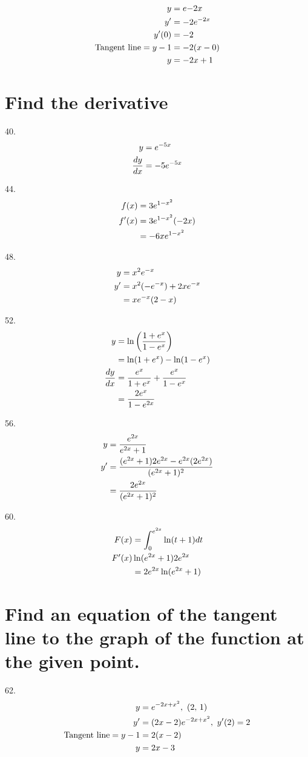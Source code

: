 \documentclass[11pt]{article}
\newcommand*{\set}{\setcounter{equation}{0}}
\newcommand*{\lt}{\left}
\newcommand*{\rt}{\right}
\newcommand*{\s}{\section}
\begin{document}
\begin{align}
    \set
    y&=e{-2x}\\
    y'&=-2e^{-2x}\\
    y'(0)&=-2\\
    \text{Tangent line}=y-1&=-2(x-0)\\
    y&=-2x+1
\end{align}

\s{Find the derivative}
40.\begin{align}
    \set
    y&=e^{-5x}\\
    \frac{dy}{dx}&=-5e^{-5x}
\end{align}

44.\begin{align}
    \set
    f(x)&=3e^{1-x^2}\\
    f'(x)&=3e^{1-x^2}(-2x)\\
    &=-6xe^{1-x^2}
\end{align}

48.\begin{align}
    \set
    y&=x^2e^{-x}\\
    y'&=x^2(-e^{-x})+2xe^{-x}\\
    &=xe^{-x}(2-x)
\end{align}

52.\begin{align}
    \set
    y&=\ln\lt(\frac{1+e^x}{1-e^x}\rt)\\
    &=\ln(1+e^x)-\ln(1-e^x)\\
    \frac{dy}{dx}&=\frac{e^x}{1+e^x}+\frac{e^x}{1-e^x}\\
    &=\frac{2e^x}{1-e^{2x}}
\end{align}

56.\begin{align}
    \set
    y&=\frac{e^{2x}}{e^{2x}+1}\\
    y'&=\frac{(e^{2x}+1)2e^{2x}-e^{2x}(2e^{2x})}{(e^{2x}+1)^2}\\
    &=\frac{2e^{2x}}{(e^{2x}+1)^2}
\end{align}

60.\begin{align}
    \set
    F(x)&=\int_{0}^{e^{2x}}\ln(t+1)dt\\
    F'(x)&\ln(e^{2x}+1)2e^{2x}\\
    &=2e^{2x}\ln(e^{2x}+1)
\end{align}

\s{Find an equation of the tangent line to the graph of the function at the given point.}
62.\begin{align}
    \set
    y&=e^{-2x+x^2},\,\, (2,\, 1)\\
    y'&=(2x-2)e^{-2x+x^2},\,\, y'(2)=2\\
    \text{Tangent line}=y-1&=2(x-2)\\
    y&=2x-3
\end{align}
\end{document}
